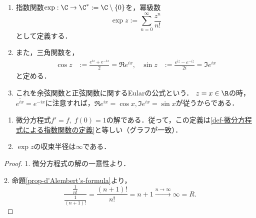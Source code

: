 \documentclass[uplatex, dvipdfmx]{jsreport}
\begin{document}
\begin{definition}\mbox{}
    \begin{enumerate}
        \item 指数関数$\exp:\C\to\C^*:=\C\setminus\{0\}$を，冪級数
        \[ \exp z:=\sum^\infty_{n=0}\frac{z^n}{n!} \]
        として定義する．
        \item また，三角関数を，
        \begin{align*}
            \cos z&:=\frac{e^{iz}+e^{-iz}}{2}=\Re e^{ix},&\sin z&:=\frac{e^{iz}-e^{-iz}}{2i}=\Im e^{ix}
        \end{align*}
        と定める．
        \item これを余弦関数と正弦関数に関するEularの公式という．
        $z=x\in\R$の時，$\overline{e^{ix}}=e^{-ix}$に注意すれば，$\Re e^{ix}=\cos x,\Im e^{ix}=\sin x$が従うからである．
    \end{enumerate}
\end{definition}
\begin{lemma}\mbox{}
    \begin{enumerate}
        \item 微分方程式$f'=f,\;f(0)=1$の解である．従って，この定義は\ref{def-微分方程式による指数関数の定義}と等しい（グラフが一致）．
        \item $\exp z$の収束半径は$\infty$である．
    \end{enumerate}
\end{lemma}
\begin{proof}
    1. 微分方程式の解の一意性より．

    2. 命題\ref{prop-d'Alembert's-formula}より，
    \[\frac{\frac{1}{n!}}{\frac{1}{(n+1)!}}=\frac{(n+1)!}{n!}=n+1\xrightarrow{n\to\infty}\infty=R.\]
\end{proof}
\end{document}
